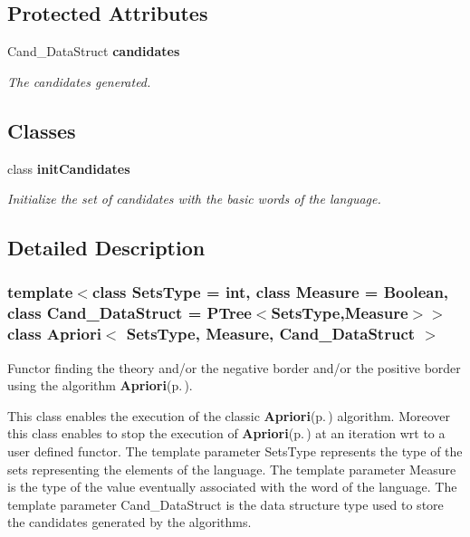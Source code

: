 \subsection*{Protected Attributes}
\begin{CompactItemize}
\item 
Cand\_\-Data\-Struct {\bf candidates}\label{class_apriori_7a7457c2cb4aacb56a88c1f70bfa5b88}

\begin{CompactList}\small\item\em The candidates generated. \item\end{CompactList}\end{CompactItemize}
\subsection*{Classes}
\begin{CompactItemize}
\item 
class {\bf init\-Candidates}
\begin{CompactList}\small\item\em Initialize the set of candidates with the basic words of the language. \item\end{CompactList}\end{CompactItemize}


\subsection{Detailed Description}
\subsubsection*{template$<$class Sets\-Type = int, class Measure = Boolean, class Cand\_\-Data\-Struct = PTree$<$Sets\-Type,Measure$>$$>$ class Apriori$<$ Sets\-Type, Measure, Cand\_\-Data\-Struct $>$}

Functor finding the theory and/or the negative border and/or the positive border using the algorithm {\bf Apriori}{\rm (p.\,\pageref{class_apriori})}. 

This class enables the execution of the classic {\bf Apriori}{\rm (p.\,\pageref{class_apriori})} algorithm. Moreover this class enables to stop the execution of {\bf Apriori}{\rm (p.\,\pageref{class_apriori})} at an iteration wrt to a user defined functor. The template parameter Sets\-Type represents the type of the sets representing the elements of the language. The template parameter Measure is the type of the value eventually associated with the word of the language. The template parameter Cand\_\-Data\-Struct is the data structure type used to store the candidates generated by the algorithms. 



